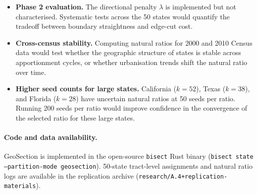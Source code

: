 \begin{itemize}
\item \textbf{Phase 2 evaluation.}
  The directional penalty $\lambda$ is implemented but not characterised.
  Systematic tests across the 50 states would quantify the tradeoff between
  boundary straightness and edge-cut cost.

\item \textbf{Cross-census stability.}
  Computing natural ratios for 2000 and 2010 Census data would test whether
  the geographic structure of states is stable across apportionment cycles,
  or whether urbanisation trends shift the natural ratio over time.

\item \textbf{Higher seed counts for large states.}
  California ($k=52$), Texas ($k=38$), and Florida ($k=28$) have uncertain
  natural ratios at 50 seeds per ratio.
  Running 200 seeds per ratio would improve confidence in the convergence
  of the selected ratio for these large states.
\end{itemize}

\paragraph{Code and data availability.}
GeoSection is implemented in the open-source \texttt{bisect} Rust binary
(\texttt{bisect state --partition-mode geosection}).
50-state tract-level assignments and natural ratio logs are available in the
replication archive (\texttt{research/A.4+replication-materials}).
